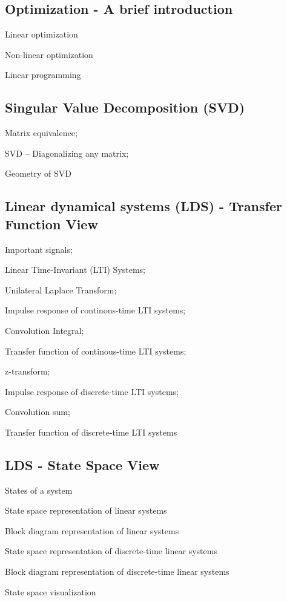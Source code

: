 \documentclass[fontsize=9pt]{scrbook}
\begin{document}
\begin{multicols}{2}
\subsection*{Optimization - A brief introduction}
\begin{enumerate*}
    \item Linear optimization
    \item Non-linear optimization
    \item Linear programming
\end{enumerate*}

\subsection*{Singular Value Decomposition (SVD)}
\begin{enumerate*}
    \item Matrix equivalence;
    \item SVD -- Diagonalizing any matrix;
    \item Geometry of SVD
\end{enumerate*}

\subsection*{Linear dynamical systems (LDS) - Transfer Function View}
\begin{enumerate*}
    \item Important signals;
    \item Linear Time-Invariant (LTI) Systems;
    \item Unilateral Laplace Transform;
    \item Impulse response of continous-time LTI systems;
    \item Convolution Integral;
    \item Transfer function of continous-time LTI systems;
    \item z-transform;
    \item Impulse response of discrete-time LTI systems;
    \item Convolution sum;
    \item Transfer function of discrete-time LTI systems
\end{enumerate*}

\subsection*{LDS - State Space View}
\begin{enumerate*}
    \item States of a system
    \item State space representation of linear systems
    \item Block diagram representation of linear systems
    \item State space representation of discrete-time linear systems
    \item Block diagram representation of discrete-time linear systems
    \item State space visualization
\end{enumerate*}


\end{multicols}
\end{document}
